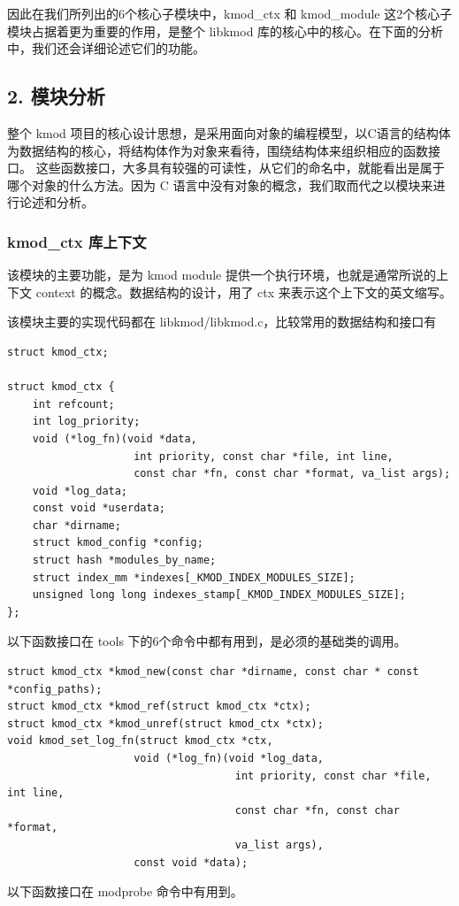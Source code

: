 \documentclass[11pt,a4paper]{article}
\begin{document}
因此在我们所列出的6个核心子模块中，kmod\_ctx 和 kmod\_module
这2个核心子模块占据着更为重要的作用，是整个 libkmod
库的核心中的核心。在下面的分析中，我们还会详细论述它们的功能。

\subsection{2. 模块分析}

整个 kmod
项目的核心设计思想，是采用面向对象的编程模型，以C语言的结构体为数据结构的核心，将结构体作为对象来看待，围绕结构体来组织相应的函数接口。
这些函数接口，大多具有较强的可读性，从它们的命名中，就能看出是属于哪个对象的什么方法。因为
C 语言中没有对象的概念，我们取而代之以模块来进行论述和分析。

\subsubsection{kmod\_ctx 库上下文}

该模块的主要功能，是为 kmod module
提供一个执行环境，也就是通常所说的上下文 context
的概念。数据结构的设计，用了 ctx 来表示这个上下文的英文缩写。

该模块主要的实现代码都在 libkmod/libkmod.c，比较常用的数据结构和接口有

{\begin{shaded}\begin{verbatim}
struct kmod_ctx;

struct kmod_ctx {
    int refcount;
    int log_priority;
    void (*log_fn)(void *data,
                    int priority, const char *file, int line,
                    const char *fn, const char *format, va_list args);
    void *log_data;
    const void *userdata;
    char *dirname;
    struct kmod_config *config;
    struct hash *modules_by_name;
    struct index_mm *indexes[_KMOD_INDEX_MODULES_SIZE];
    unsigned long long indexes_stamp[_KMOD_INDEX_MODULES_SIZE];
};
\end{verbatim}\end{shaded}}
以下函数接口在 tools 下的6个命令中都有用到，是必须的基础类的调用。

{\begin{shaded}\begin{verbatim}
struct kmod_ctx *kmod_new(const char *dirname, const char * const *config_paths);
struct kmod_ctx *kmod_ref(struct kmod_ctx *ctx);
struct kmod_ctx *kmod_unref(struct kmod_ctx *ctx);
void kmod_set_log_fn(struct kmod_ctx *ctx,
                    void (*log_fn)(void *log_data,
                                    int priority, const char *file, int line,
                                    const char *fn, const char *format,
                                    va_list args),
                    const void *data);
\end{verbatim}\end{shaded}}
以下函数接口在 modprobe 命令中有用到。
\end{document}
